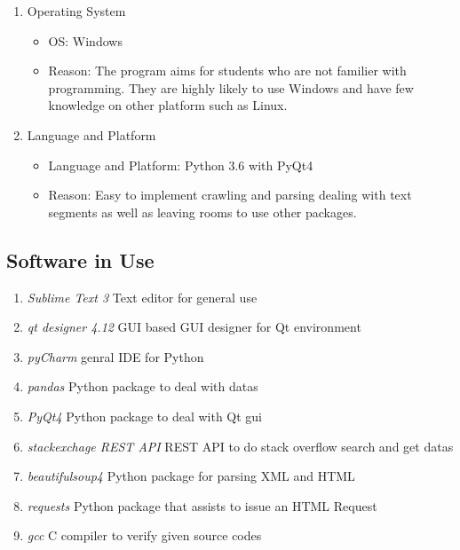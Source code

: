 \documentclass[conference]{IEEEtran}
\begin{document}
\begin{enumerate}
  \item Operating System
  \begin{itemize}
    \item OS: Windows
    \item Reason: The program aims for students who are not familier with programming. They are highly likely to use Windows and have few knowledge on other platform such as Linux.
  \end{itemize}
  \item Language and Platform
  \begin{itemize}
    \item Language and Platform: Python 3.6 with PyQt4
    \item Reason: Easy to implement crawling and parsing dealing with text segments as well as leaving rooms to use other packages.
  \end{itemize}
\end{enumerate}
\textit{}


\subsection{Software in Use} %
\label{sub:software_in_use}

\begin{enumerate}
  \item \textit{Sublime Text 3} Text editor for general use
  \item \textit{qt designer 4.12} GUI based GUI designer for Qt environment
  \item \textit{pyCharm} genral IDE for Python
  \item \textit{pandas} Python package to deal with datas
  \item \textit{PyQt4} Python package to deal with Qt gui
  \item \textit{stackexchage REST API} REST API to do stack overflow search and get datas
  \item \textit{beautifulsoup4} Python package for parsing XML and HTML
  \item \textit{requests} Python package that assists to issue an HTML Request
  \item \textit{gcc} C compiler to verify given source codes
\end{enumerate}
\end{document}

